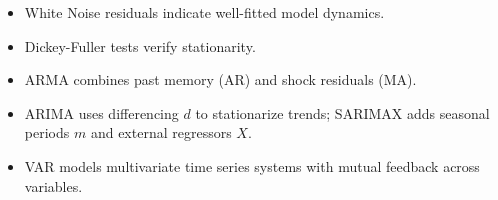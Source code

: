 \documentclass[10pt,a4paper]{article}
\newenvironment{keytake}{\begin{tcolorbox}}{\end{tcolorbox}}
\begin{document}
\begin{keytake}
\begin{itemize}
\item White Noise residuals indicate well-fitted model dynamics.
\item Dickey-Fuller tests verify stationarity.
\item ARMA combines past memory (AR) and shock residuals (MA).
\item ARIMA uses differencing $d$ to stationarize trends; SARIMAX adds seasonal periods $m$ and external regressors $X$.
\item VAR models multivariate time series systems with mutual feedback across variables.
\end{itemize}
\end{keytake}
\end{document}
